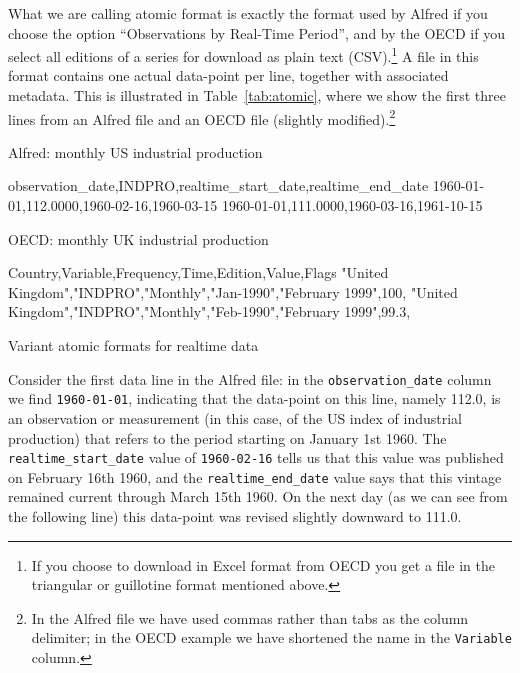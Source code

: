 What we are calling atomic format is exactly the format used by Alfred
if you choose the option ``Observations by Real-Time Period'', and by
the OECD if you select all editions of a series for download as plain
text (CSV).\footnote{If you choose to download in Excel format from
  OECD you get a file in the triangular or guillotine format mentioned
  above.} A file in this format contains one actual data-point per
line, together with associated metadata. This is illustrated in
Table~\ref{tab:atomic}, where we show the first three lines from an
Alfred file and an OECD file (slightly modified).\footnote{In the
  Alfred file we have used commas rather than tabs as the column
  delimiter; in the OECD example we have shortened the name in the
  \texttt{Variable} column.}

\begin{table}[htbp]
\begin{center}
Alfred: monthly US industrial production
\begin{code}
observation_date,INDPRO,realtime_start_date,realtime_end_date
1960-01-01,112.0000,1960-02-16,1960-03-15
1960-01-01,111.0000,1960-03-16,1961-10-15
\end{code}
OECD: monthly UK industrial production
\begin{code}
Country,Variable,Frequency,Time,Edition,Value,Flags
"United Kingdom","INDPRO","Monthly","Jan-1990","February 1999",100,
"United Kingdom","INDPRO","Monthly","Feb-1990","February 1999",99.3,
\end{code}
\end{center}
\caption{Variant atomic formats for realtime data}
\label{tab:atomic}
\end{table}

Consider the first data line in the Alfred file: in the
\verb|observation_date| column we find \texttt{1960-01-01}, indicating
that the data-point on this line, namely 112.0, is an observation or
measurement (in this case, of the US index of industrial production)
that refers to the period starting on January 1st 1960. The
\verb|realtime_start_date| value of \texttt{1960-02-16} tells us that
this value was published on February 16th 1960, and the
\verb|realtime_end_date| value says that this vintage remained current
through March 15th 1960. On the next day (as we can see from the
following line) this data-point was revised slightly downward to
111.0.

